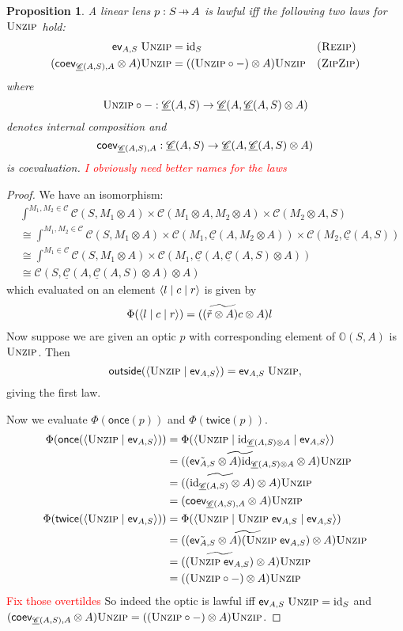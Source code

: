 \documentclass[11pt,a4paper]{article}
\theoremstyle{plain}
\newtheorem{proposition}[theorem]{Proposition}
\theoremstyle{definition}
\newcommand{\C}{\mathscr{C}}
\newcommand{\homC}{\underline{\C}}
\newcommand{\id}{\mathrm{id}}
\newcommand{\rep}[2]{{\ensuremath \left\langle #1 \mid #2 \right\rangle}}
\newcommand{\repthree}[3]{{\ensuremath \langle #1 \mid #2 \mid #3 \rangle}}
\newcommand{\funzip}{\textsc{Unzip}}
\newcommand{\outside}{\mathsf{outside}}
\newcommand{\once}{\mathsf{once}}
\newcommand{\twice}{\mathsf{twice}}
\newcommand{\hto}{\ensuremath{\,\mathaccent\shortmid\rightarrow\,}}
\newcommand{\todo}[1]{\textcolor{red}{\small #1}}
\begin{document}
\begin{proposition}
  A linear lens $p : S \hto A$ is lawful iff the following two laws for $\funzip$ hold:
  \begin{align*}
    \ev_{A, S} \; \funzip &= \id_S && \textsc{(Rezip)} \\
    (\coev_{\homC(A, S), A} \otimes A)\funzip &= ((\funzip \circ -) \otimes A)\funzip && \textsc{(ZipZip)}
  \end{align*}
  where \[ \funzip \circ - : \homC(A, S) \to \homC(A, \homC(A, S) \otimes A) \] denotes internal composition and \[\coev_{\homC(A, S), A} : \homC(A, S) \to \homC(A, \homC(A, S) \otimes A)\] is coevaluation.
  \todo{I obviously need better names for the laws}
\end{proposition}
\begin{proof}
  We have an isomorphism:
  \begin{align*}
    & \int^{M_1, M_2 \in \C} \C(S, M_1 \otimes A) \times \C(M_1 \otimes A, M_2 \otimes A) \times \C(M_2 \otimes A, S) \\
    &\cong \int^{M_1, M_2 \in \C} \C(S, M_1 \otimes A) \times \C(M_1, \homC(A, M_2 \otimes A)) \times \C(M_2, \homC(A, S)) \\
    &\cong \int^{M_1 \in \C} \C(S, M_1 \otimes A) \times \C(M_1, \homC(A, \homC(A, S) \otimes A)) \\
    &\cong \C(S, \homC(A, \homC(A, S) \otimes A) \otimes A)
  \end{align*}
  which evaluated on an element $\repthree{l}{c}{r }$ is given by
  \begin{align*}
    \Phi(\repthree{l}{c}{r}) &= (\widetilde{(\tilde{r} \otimes A)c} \otimes A)l
  \end{align*}
  Now suppose we are given an optic $p$ with corresponding element of $\mathbb{O}(S, A)$ is $\funzip$. Then \[\outside(\rep{\funzip }{\ev_{A, S} }) = \ev_{A, S} \; \funzip,\] giving the first law.

  Now we evaluate $\Phi(\once(p))$ and $\Phi(\twice(p))$.
  \begin{align*}
    \Phi(\once(\rep{\funzip }{\ev_{A, S} }))
    &= \Phi(\repthree{\funzip }{\id_{\homC(A,S) \otimes A}}{\ev_{A, S} }) \\
    &= (\widetilde{(\tilde{\ev_{A, S}} \otimes A)\id_{\homC(A,S) \otimes A}} \otimes A)\funzip \\
    &= (\widetilde{(\id_{\homC(A, S)} \otimes A)} \otimes A)\funzip \\
    &= (\coev_{\homC(A, S), A} \otimes A)\funzip \\
    \Phi(\twice(\rep{\funzip }{\ev_{A, S} }))
    &= \Phi(\repthree{\funzip }{\funzip \; \ev_{A, S}}{\ev_{A, S} }) \\
    &= (\widetilde{(\tilde{\ev_{A, S}} \otimes A)(\funzip \; \ev_{A, S})} \otimes A)\funzip \\
    &= (\widetilde{(\funzip \; \ev_{A, S})} \otimes A)\funzip \\
    &= ((\funzip \circ -) \otimes A)\funzip
  \end{align*}
  \todo{Fix those overtildes}
  So indeed the optic is lawful iff $\ev_{A, S} \; \funzip = \id_S$ and $(\coev_{\homC(A, S), A} \otimes A)\funzip = ((\funzip \circ -) \otimes A)\funzip$.
\end{proof}
\end{document}
